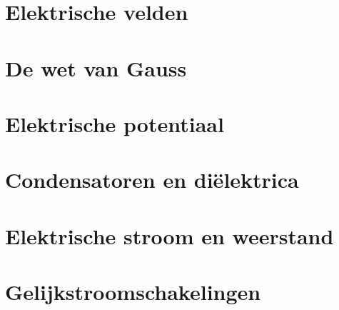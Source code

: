 \section{Elektrische velden}

\vspace{0.5cm}



\newpage

\section{De wet van Gauss}

\vspace{0.5cm}



\newpage

\section{Elektrische potentiaal}

\vspace{0.5cm}



\newpage

\section{Condensatoren en diëlektrica}

\vspace{0.5cm}



\newpage

\section{Elektrische stroom en weerstand}

\vspace{0.5cm}



\newpage

\section{Gelijkstroomschakelingen}

\vspace{0.5cm}

